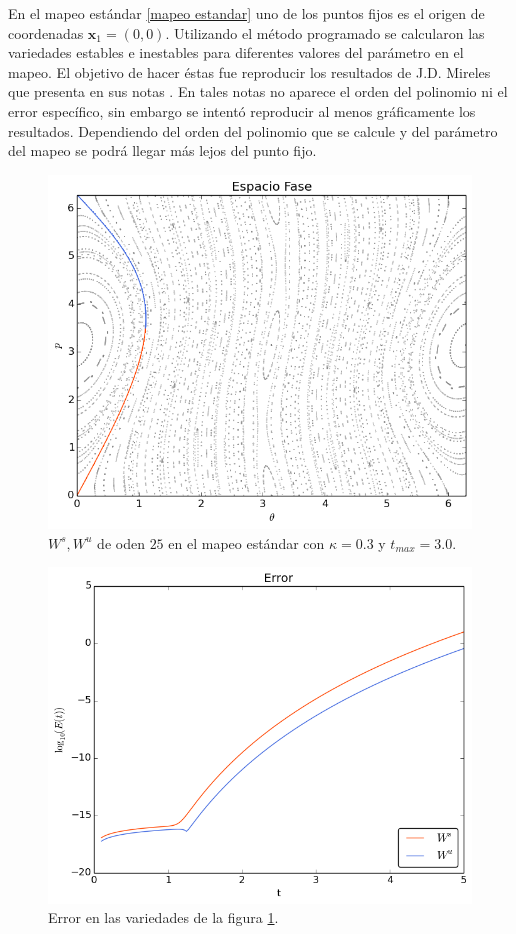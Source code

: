 En el mapeo estándar \eqref{mapeo estandar} uno de los puntos fijos es el origen de coordenadas $\mathbf{x}_{1}=(0,0)$. Utilizando el método programado se calcularon las variedades estables e inestables para diferentes valores del parámetro en el mapeo. El objetivo de hacer éstas fue reproducir los resultados de J.D. Mireles que presenta en sus notas \cite{Mireles}. En tales notas no aparece el orden del polinomio ni el error específico, sin embargo se intentó reproducir al menos gráficamente los resultados. Dependiendo del orden del polinomio que se calcule y del parámetro del mapeo se podrá llegar más lejos del punto fijo.  
\begin{figure}[H]
 \centering
 \includegraphics[scale=0.6]{estandark03}
 \caption{\footnotesize $W^{s},W^{u}$ de oden $25$ en el mapeo estándar con $\kappa=0.3$ y $t_{max}=3.0$.}
 \label{estandar03}
\end{figure}

\begin{figure}[H]
\centering
\includegraphics[scale=0.6]{error_est_k03} 
\caption{Error en las variedades de la figura \ref{estandar03}.}
\label{error est k03}
\end{figure}


